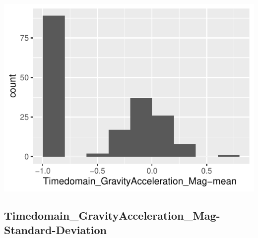 \documentclass[
]{article}
\begin{document}
\begin{minipage}{0.25 \textwidth}

\includegraphics{codebook_tidydatasub_files/figure-latex/Var-35-Timedomain-GravityAcceleration-Mag-mean--1.pdf}

\end{minipage}

\noindent\makebox[\linewidth]{\rule{\textwidth}{0.4pt}}

\hypertarget{timedomain_gravityacceleration_mag-standard-deviation}{%
\subsection{Timedomain\_GravityAcceleration\_Mag-Standard-Deviation}\label{timedomain_gravityacceleration_mag-standard-deviation}}
\end{document}
